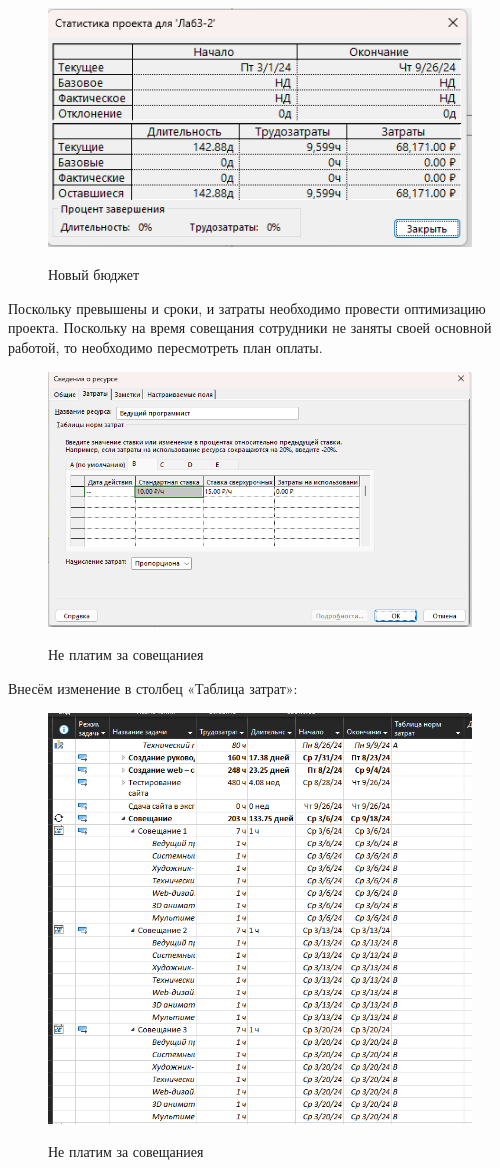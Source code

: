 \begin{figure}[ht!]
	\includegraphics[width=0.75\linewidth]{assets/images/stat-1.png}
	\label{fig:r2}
	\caption{Новый бюджет}
\end{figure}
\FloatBarrier


Поскольку превышены и сроки, и затраты необходимо провести оптимизацию проекта. Поскольку на время совещания сотрудники не заняты своей основной работой, то необходимо пересмотреть план оплаты.

\begin{figure}[ht!]
	\includegraphics[width=0.75\linewidth]{assets/images/optimaz-1.png}
	\label{fig:r2}
	\caption{Не платим за совещаниея}
\end{figure}
\FloatBarrier

Внесём изменение в столбец «Таблица затрат»:

\begin{figure}[ht!]
	\includegraphics[width=0.75\linewidth]{assets/images/sovesh.png}
	\label{fig:r2}
	\caption{Не платим за совещаниея}
\end{figure}
\FloatBarrier


